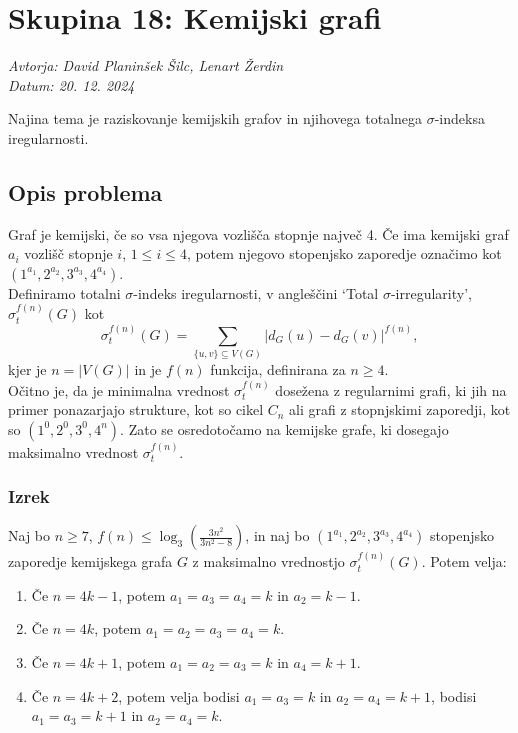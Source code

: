 \documentclass{article}
\begin{document}
\section*{Skupina 18: Kemijski grafi}
\textit{Avtorja: David Planinšek Šilc, Lenart Žerdin \\ Datum: 20. 12. 2024 \\}


Najina tema je raziskovanje kemijskih grafov in njihovega totalnega $\sigma$-indeksa iregularnosti.

\subsection*{Opis problema}

Graf je kemijski, če so vsa njegova vozlišča stopnje največ 4. Če ima kemijski graf $a_i$ vozlišč stopnje $i$, $1 \leq i \leq 4$, potem njegovo stopenjsko zaporedje označimo kot $(1^{a_1}, 2^{a_2}, 3^{a_3}, 4^{a_4})$. \\

Definiramo totalni $\sigma$-indeks iregularnosti, v angleščini `Total $\sigma$-irregularity', $\sigma_t^{f(n)}(G)$ kot
\[
\sigma_t^{f(n)}(G) = \sum_{\{u,v\} \subseteq V(G)} \left| d_G(u) - d_G(v) \right|^{f(n)},
\]
kjer je $n = |V(G)|$ in je $f(n)$ funkcija, definirana za $n \geq 4$. \\


Očitno je, da je minimalna vrednost $\sigma_t^{f(n)}$ dosežena z regularnimi grafi, ki jih na primer ponazarjajo strukture, kot so cikel $C_n$ ali grafi z stopnjskimi zaporedji, kot so $(1^0, 2^0, 3^0, 4^n)$. 
Zato se osredotočamo na kemijske grafe, ki dosegajo maksimalno vrednost $\sigma_t^{f(n)}$.

\subsubsection*{Izrek}
Naj bo $n \geq 7$, $f(n) \leq \log_3 \left( \frac{3n^2}{3n^2 - 8} \right)$, in naj bo $(1^{a_1}, 2^{a_2}, 3^{a_3}, 4^{a_4})$ stopenjsko zaporedje kemijskega grafa $G$ z maksimalno vrednostjo $\sigma_t^{f(n)}(G)$. Potem velja:
\begin{enumerate}
    \item Če $n = 4k - 1$, potem $a_1 = a_3 = a_4 = k$ in $a_2 = k - 1$.
    \item Če $n = 4k$, potem $a_1 = a_2 = a_3 = a_4 = k$.
    \item Če $n = 4k + 1$, potem $a_1 = a_2 = a_3 = k$ in $a_4 = k + 1$.
    \item Če $n = 4k + 2$, potem velja bodisi $a_1 = a_3 = k$ in $a_2 = a_4 = k + 1$, bodisi $a_1 = a_3 = k + 1$ in $a_2 = a_4 = k$. 
\end{enumerate}
\end{document}
